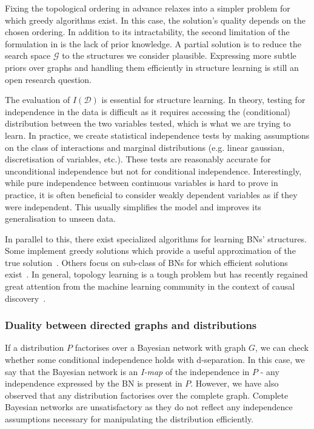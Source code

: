 Fixing the topological ordering in advance relaxes  into a simpler problem for which greedy algorithms exist. In this case, the solution's quality depends on the chosen ordering. In addition to its intractability, the second limitation of the formulation in  is the lack of prior knowledge. A partial solution is to reduce the search space $\mathcal{G}$ to the structures we consider plausible. Expressing more subtle priors over graphs and handling them efficiently in structure learning is still an open research question.

The evaluation of $I(\mathcal{D})$ is essential for structure learning. In theory, testing for independence in the data is difficult as it requires accessing the (conditional) distribution between the two variables tested, which is what we are trying to learn. In practice, we create statistical independence tests by making assumptions on the class of interactions and marginal distributions (e.g. linear gaussian, discretisation of variables, etc.). These tests are reasonably accurate for unconditional independence but not for conditional independence. Interestingly, while pure independence between continuous variables is hard to prove in practice, it is often beneficial to consider weakly dependent variables as if they were independent. This usually simplifies the model and improves its generalisation to unseen data.

In parallel to this, there exist specialized algorithms for learning BNs' structures. Some implement greedy solutions which provide a useful approximation of the true solution~\citep{tsamardinos2006max}. Others focus on sub-class of BNs for which efficient solutions exist~\citep{cooper1992Bayesian, chow1968approximating}. In general, topology learning is a tough problem but has recently regained great attention from the machine learning community in the context of causal discovery~\citep{khemakhem_causal_2020, balgi2022counterfactual, vowels2021d, brouillard2020differentiable}.


\subsubsection{Duality between directed graphs and distributions}
If a distribution $P$ factorises over a Bayesian network with graph $G$, we can check whether some conditional independence holds with d-separation. In this case, we say that the Bayesian network is an \textit{I-map} of the independence in $P$ - any independence expressed by the BN is present in $P$. However, we have also observed that any distribution factorises over the complete graph. Complete Bayesian networks are unsatisfactory as they do not reflect any independence assumptions necessary for manipulating the distribution efficiently.

